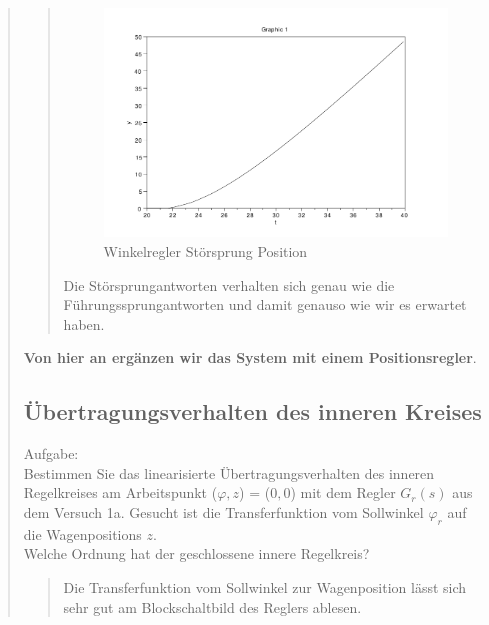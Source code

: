 \begin{quote}
\begin{quote}
        \begin{figure}[H]
        \centering
            \includegraphics[scale=0.7, trim = 0cm 0cm 0cm 0cm, clip]{./Bilder/Winkelregler_Stoer_Position}
                \caption{Winkelregler Störsprung Position}
        \end{figure}
        
        
        Die Störsprungantworten verhalten sich genau wie die Führungssprungantworten und damit genauso wie wir es
        erwartet haben.
        
    \end{quote}  %
    \vspace{1em}
    
    \textbf{Von hier an ergänzen wir das System mit einem Positionsregler}.
    
    
    \subsection{Übertragungsverhalten des inneren Kreises}
    Aufgabe:\\
    Bestimmen Sie das linearisierte Übertragungsverhalten des inneren Regelkreises am Arbeitspunkt ($\varphi, z$) =
    ($0, 0$) mit dem Regler $G_r(s)$ aus dem Versuch 1a. Gesucht ist die Transferfunktion vom Sollwinkel $\varphi_r$ auf
    die Wagenpositions $z$.\\
    Welche Ordnung hat der geschlossene innere Regelkreis?
    \begin{quote}
        Die Transferfunktion vom Sollwinkel zur Wagenposition lässt sich sehr gut am Blockschaltbild des Reglers ablesen. 
        

\end{quote}
\end{quote}
